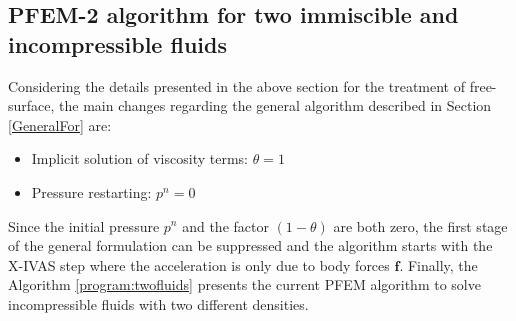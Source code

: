 \subsection[PFEM-2 free-surface algorithm]{PFEM-2 algorithm for two immiscible and incompressible fluids}

Considering the details presented in the above section for the treatment of free-surface, the main changes regarding the general algorithm described in Section \ref{GeneralFor} are:
\begin{itemize}
  \item Implicit solution of viscosity terms: $\theta=1$
  \item Pressure restarting: $p^n=0$
\end{itemize}
Since the initial pressure $p^n$ and the factor $(1-\theta)$ are both zero, the first stage of the general formulation can be suppressed and the algorithm starts with the X-IVAS step where the acceleration is only due to body forces $\mathbf{f}$. Finally, the Algorithm \ref{program:twofluids} presents the current PFEM algorithm to solve incompressible fluids with two different densities.

